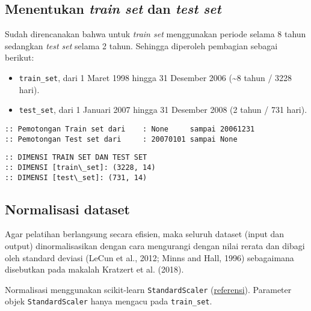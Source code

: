 \documentclass[11pt]{article}
\providecommand{\tightlist}{%
      \setlength{\itemsep}{0pt}\setlength{\parskip}{0pt}}
\begin{document}
    \hypertarget{menentukan-train-set-dan-test-set}{%
\subsection{\texorpdfstring{Menentukan \emph{train set} dan \emph{test
set}}{Menentukan train set dan test set}}\label{menentukan-train-set-dan-test-set}}

Sudah direncanakan bahwa untuk \emph{train set} menggunakan periode
selama 8 tahun sedangkan \emph{test set} selama 2 tahun. Sehingga
diperoleh pembagian sebagai berikut:

\begin{itemize}
\tightlist
\item
  \texttt{train\_set}, dari 1 Maret 1998 hingga 31 Desember 2006
  (\textasciitilde{}8 tahun / 3228 hari).
\item
  \texttt{test\_set}, dari 1 Januari 2007 hingga 31 Desember 2008 (2
  tahun / 731 hari).
\end{itemize}

    \begin{Verbatim}[commandchars=\\\{\}]
:: Pemotongan Train set dari    : None     sampai 20061231
:: Pemotongan Test set dari     : 20070101 sampai None
    \end{Verbatim}

    \begin{Verbatim}[commandchars=\\\{\}]
:: DIMENSI TRAIN SET DAN TEST SET
:: DIMENSI [train\_set]: (3228, 14)
:: DIMENSI [test\_set]: (731, 14)
    \end{Verbatim}

    \hypertarget{normalisasi-dataset}{%
\subsection{Normalisasi dataset}\label{normalisasi-dataset}}

Agar pelatihan berlangsung secara efisien, maka seluruh dataset (input
dan output) dinormalisasikan dengan cara mengurangi dengan nilai rerata
dan dibagi oleh standard deviasi (LeCun et al., 2012; Minns and Hall,
1996) sebagaimana disebutkan pada makalah Kratzert et al. (2018).

Normalisasi menggunakan scikit-learn \texttt{StandardScaler}
(\href{https://scikit-learn.org/stable/modules/generated/sklearn.preprocessing.StandardScaler.html}{referensi}).
Parameter objek \texttt{StandardScaler} hanya mengacu pada
\texttt{train\_set}.
\end{document}
